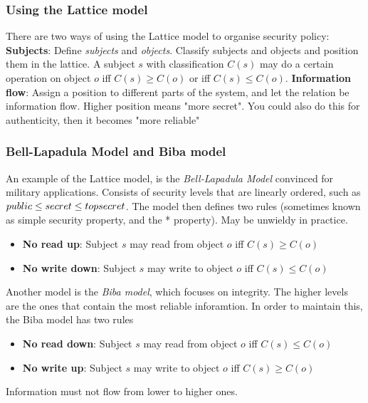 \documentclass[14pt]{beamer}
\begin{document}
    \begin{frame}
        \frametitle{Using the Lattice model}
            There are two ways of using the Lattice model to organise security policy: 
            \textbf{Subjects}: Define \textit{subjects} and \textit{objects}. Classify subjects and objects and position them in the lattice. A subject $s$ with classification $C(s)$ may do a certain operation on object $o$ iff $C(s) \geq C(o)$ or iff $C(s) \leq C(o)$. 
            \textbf{Information flow}: Assign a position to different parts of the system, and let the relation be information flow. Higher position means "more secret". You could also do this for authenticity, then it becomes "more reliable"    
    \end{frame}
    \begin{frame}
        \frametitle{Bell-Lapadula Model and Biba model}
            An example of the Lattice model, is the \textit{Bell-Lapadula Model} convinced for military applications. 
            Consists of security levels that are linearly ordered, such as $public \leq secret \leq top\-secret$. The model then defines two rules (sometimes known as simple security property, and the * property). May be unwieldy in practice.
            \begin{itemize}
                \item \textbf{No read up}: Subject $s$ may read from object $o$ iff $C(s) \geq C(o)$
                \item \textbf{No write down}: Subject $s$ may write to object $o$ iff $C(s) \leq C(o)$
            \end{itemize}
            Another model is the \textit{Biba model}, which focuses on integrity. The higher levels are the ones that contain the most reliable inforamtion. In order to maintain this, the Biba model has two rules
            \begin{itemize}
                \item \textbf{No read down}: Subject $s$ may read from object $o$ iff $C(s) \leq C(o)$
                \item \textbf{No write up}: Subject $s$ may write to object $o$ iff $C(s) \geq C(o)$
            \end{itemize}
            Information must not flow from lower to higher ones.     
    \end{frame}
\end{document}
